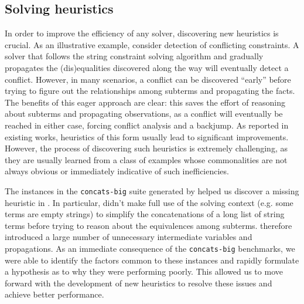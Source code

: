    
\vspace{-0.15in}    
\subsection{Solving heuristics}
\vspace{-0.1in}

In order to improve the efficiency of any solver, discovering new heuristics is crucial.
As an illustrative example, consider detection of conflicting constraints.
A solver that follows the string constraint solving algorithm and gradually propagates
the (dis)equalities discovered along the way will eventually detect a conflict.
However, in many scenarios, a conflict can be discovered ``early'' before trying to
figure out the relationships among subterms and propagating the facts.
The benefits of this eager approach are clear: this saves the effort of reasoning about
subterms and propagating observations, as a conflict will eventually be reached in either case,
forcing conflict analysis and a backjump.
As reported in existing works, heuristics of this form usually lead to significant improvements.
However, the process of discovering such heuristics is extremely challenging,
as they are usually learned from a class of examples whose commonalities
are not always obvious or immediately indicative of such inefficiencies.

The instances in the \texttt{concats-big} suite generated by \fuzzer{} helped us 
discover a missing heuristic in \us{}. In particular, \us{} didn't make full use 
of the solving context (e.g. some terms are empty strings) to simplify the 
concatenations of a long list of string terms before trying to reason about the 
equivalences among subterms. \us{} therefore introduced a large number of unnecessary
intermediate variables and propagations.
As an immediate consequence of the \texttt{concats-big} benchmarks, we were able to identify
the factors common to these instances and rapidly formulate a hypothesis as to why they were
performing poorly. This allowed us to move forward with the development of new heuristics
to resolve these issues and achieve better performance.



